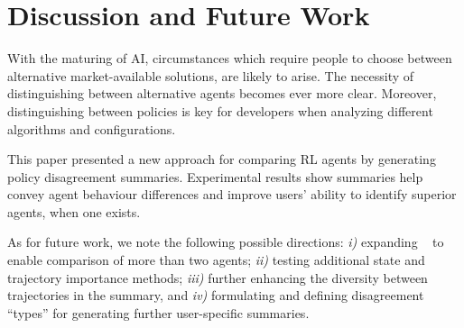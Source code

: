 \section{Discussion and Future Work} \label{sec:conclusion} 
With the maturing of AI, circumstances which require people to choose between alternative market-available solutions, are likely to arise. The necessity of distinguishing between alternative agents becomes ever more clear. Moreover, distinguishing between policies is key for developers when analyzing different algorithms and  configurations. 

This paper presented a new approach for comparing RL agents by generating policy disagreement summaries. Experimental results show summaries help convey agent behaviour differences and improve users' ability to identify superior agents, when one exists. 







As for future work, we note the following possible directions: \textit{i)} expanding \disalg~ to enable comparison of more than two agents; \textit{ii)} testing additional state and trajectory importance methods; \textit{iii)} further enhancing the diversity between trajectories in the summary, and  \textit{iv)} formulating and defining disagreement ``types'' for generating further user-specific summaries.



